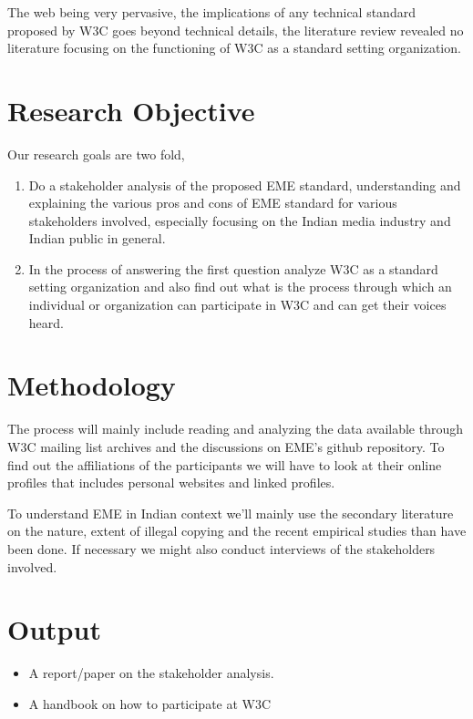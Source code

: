 \documentclass{article}
\begin{document}
The web being very pervasive, the implications of any technical standard
proposed by W3C goes beyond technical details, the literature review revealed
no literature focusing on the functioning of W3C as a standard setting
organization.


\section*{Research Objective}

Our research goals are two fold,

\begin{enumerate}

\item Do a stakeholder analysis of the proposed EME standard, understanding and
  explaining the various pros and cons of EME standard for various stakeholders
involved, especially focusing on the Indian media industry and Indian public in
general.

\item In the process of answering the first question analyze W3C as a standard setting
   organization and also find out what is the process through which an
individual or organization can participate in W3C and can get their voices
heard.

\end{enumerate}


\section*{Methodology}

The process will mainly include reading and analyzing the data available
through W3C mailing list archives and the discussions on EME's github
repository. To find out the affiliations of the participants we will have to
look at their online profiles that includes personal websites and linked
profiles.

To understand EME in Indian context we'll mainly use the secondary literature
on the nature, extent of illegal copying and the recent empirical studies than
have been done. If necessary we might also conduct interviews of the
stakeholders involved.

\section*{Output}

\begin{itemize}
\item A report/paper on the stakeholder analysis.
\item A handbook on how to participate at W3C
\end{itemize}
\end{document}
